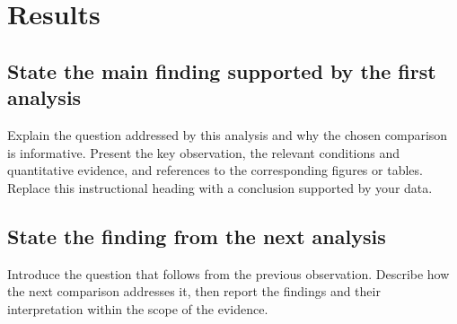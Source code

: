 \section{Results}

\subsection{State the main finding supported by the first analysis}

Explain the question addressed by this analysis and why the chosen comparison
is informative. Present the key observation, the relevant conditions and
quantitative evidence, and references to the corresponding figures or tables.
Replace this instructional heading with a conclusion supported by your data.

\subsection{State the finding from the next analysis}

Introduce the question that follows from the previous observation. Describe
how the next comparison addresses it, then report the findings and their
interpretation within the scope of the evidence.
